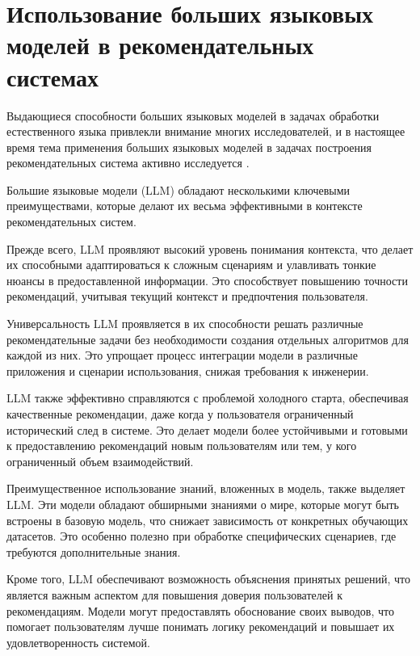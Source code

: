 \section{Использование больших языковых моделей в рекомендательных системах}

Выдающиеся способности больших языковых моделей в задачах обработки естественного языка привлекли внимание многих исследователей, и в настоящее время тема применения больших языковых моделей в задачах построения рекомендательных система активно исследуется \cite{do_llm_undertand_preferences, llm_rs_p5, llm_rs_survey}.

Большие языковые модели (LLM) обладают несколькими ключевыми преимуществами, которые делают их весьма эффективными в контексте рекомендательных систем.

Прежде всего, LLM проявляют высокий уровень понимания контекста, что делает их способными адаптироваться к сложным сценариям и улавливать тонкие нюансы в предоставленной информации. Это способствует повышению точности рекомендаций, учитывая текущий контекст и предпочтения пользователя.

Универсальность LLM проявляется в их способности решать различные рекомендательные задачи без необходимости создания отдельных алгоритмов для каждой из них. Это упрощает процесс интеграции модели в различные приложения и сценарии использования, снижая требования к инженерии.

LLM также эффективно справляются с проблемой холодного старта, обеспечивая качественные рекомендации, даже когда у пользователя ограниченный исторический след в системе. Это делает модели более устойчивыми и готовыми к предоставлению рекомендаций новым пользователям или тем, у кого ограниченный объем взаимодействий.

Преимущественное использование знаний, вложенных в модель, также выделяет LLM. Эти модели обладают обширными знаниями о мире, которые могут быть встроены в базовую модель, что снижает зависимость от конкретных обучающих датасетов. Это особенно полезно при обработке специфических сценариев, где требуются дополнительные знания.

Кроме того, LLM обеспечивают возможность объяснения принятых решений, что является важным аспектом для повышения доверия пользователей к рекомендациям. Модели могут предоставлять обоснование своих выводов, что помогает пользователям лучше понимать логику рекомендаций и повышает их удовлетворенность системой.

